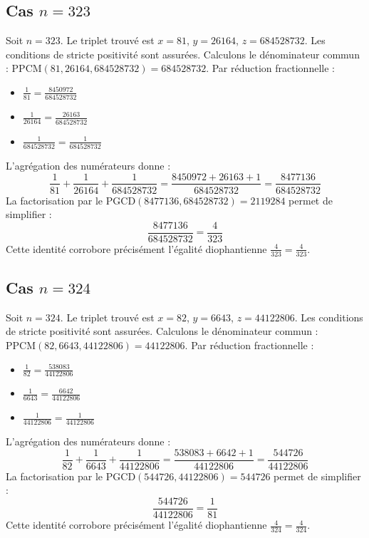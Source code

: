 \documentclass[11pt,a4paper]{article}
\begin{document}
\subsection{Cas $n = 323$}
Soit $n = 323$. Le triplet trouvé est $x = 81$, $y = 26164$, $z = 684528732$.
Les conditions de stricte positivité sont assurées.
Calculons le dénominateur commun : $\text{PPCM}(81, 26164, 684528732) = 684528732$.
Par réduction fractionnelle :
\begin{itemize}
    \item $\frac{1}{81} = \frac{8450972}{684528732}$
    \item $\frac{1}{26164} = \frac{26163}{684528732}$
    \item $\frac{1}{684528732} = \frac{1}{684528732}$
\end{itemize}
L'agrégation des numérateurs donne :
$$ \frac{1}{81} + \frac{1}{26164} + \frac{1}{684528732} = \frac{8450972 + 26163 + 1}{684528732} = \frac{8477136}{684528732} $$
La factorisation par le $\text{PGCD}(8477136, 684528732) = 2119284$ permet de simplifier :
$$ \frac{8477136}{684528732} = \frac{4}{323} $$
Cette identité corrobore précisément l'égalité diophantienne $\frac{4}{323} = \frac{4}{323}$.

\subsection{Cas $n = 324$}
Soit $n = 324$. Le triplet trouvé est $x = 82$, $y = 6643$, $z = 44122806$.
Les conditions de stricte positivité sont assurées.
Calculons le dénominateur commun : $\text{PPCM}(82, 6643, 44122806) = 44122806$.
Par réduction fractionnelle :
\begin{itemize}
    \item $\frac{1}{82} = \frac{538083}{44122806}$
    \item $\frac{1}{6643} = \frac{6642}{44122806}$
    \item $\frac{1}{44122806} = \frac{1}{44122806}$
\end{itemize}
L'agrégation des numérateurs donne :
$$ \frac{1}{82} + \frac{1}{6643} + \frac{1}{44122806} = \frac{538083 + 6642 + 1}{44122806} = \frac{544726}{44122806} $$
La factorisation par le $\text{PGCD}(544726, 44122806) = 544726$ permet de simplifier :
$$ \frac{544726}{44122806} = \frac{1}{81} $$
Cette identité corrobore précisément l'égalité diophantienne $\frac{4}{324} = \frac{4}{324}$.
\end{document}
